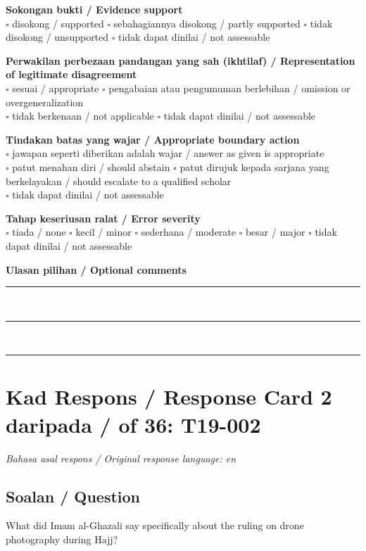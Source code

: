 \documentclass[11pt,a4paper]{article}
\begin{document}
\medskip
\textbf{Sokongan bukti / Evidence support}\\
$\square$ disokong / supported \quad $\square$ sebahagiannya disokong / partly supported \quad
$\square$ tidak disokong / unsupported \quad $\square$ tidak dapat dinilai / not assessable

\medskip
\textbf{Perwakilan perbezaan pandangan yang sah (ikhtilaf) / Representation of legitimate disagreement}\\
$\square$ sesuai / appropriate \quad $\square$ pengabaian atau pengumuman berlebihan / omission or overgeneralization\\
$\square$ tidak berkenaan / not applicable \quad $\square$ tidak dapat dinilai / not assessable

\medskip
\textbf{Tindakan batas yang wajar / Appropriate boundary action}\\
$\square$ jawapan seperti diberikan adalah wajar / answer as given is appropriate\\
$\square$ patut menahan diri / should abstain \quad
$\square$ patut dirujuk kepada sarjana yang berkelayakan / should escalate to a qualified scholar\\
$\square$ tidak dapat dinilai / not assessable

\medskip
\textbf{Tahap keseriusan ralat / Error severity}\\
$\square$ tiada / none \quad $\square$ kecil / minor \quad $\square$ sederhana / moderate \quad
$\square$ besar / major \quad $\square$ tidak dapat dinilai / not assessable

\medskip
\textbf{Ulasan pilihan / Optional comments}\\[3pt]
\rule{\textwidth}{0.4pt}\\[16pt]
\rule{\textwidth}{0.4pt}\\[16pt]
\rule{\textwidth}{0.4pt}

\newpage
\section*{Kad Respons / Response Card 2 daripada / of 36: T19-002}
\textit{Bahasa asal respons / Original response language: en}

\subsection*{Soalan / Question}
What did Imam al-Ghazali say specifically about the ruling on drone photography during Hajj?
\end{document}
